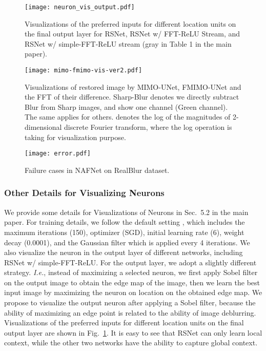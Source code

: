 \documentclass[letterpaper]{article} \usepackage{aaai23}  \usepackage{times}  \usepackage{helvet}  \usepackage{courier}  \usepackage[hyphens]{url}  \usepackage{graphicx} \usepackage{enumitem}
\begin{document}
\begin{figure}[t]
\begin{center}
    \texttt{[image: neuron\_vis\_output.pdf]}
\end{center}
\vspace{-0.8em}
\caption{Visualizations of the preferred inputs for different location units on the final output layer for RSNet, RSNet w/ FFT-ReLU Stream, and RSNet w/ simple-FFT-ReLU stream (\colorbox{gray!20}{gray} in Table 1 in the main paper).} 
\label{fig:neuron_vis_output}
\vspace{-1em}
\end{figure}

\begin{figure*}[t]
\begin{center}
    \texttt{[image: mimo-fmimo-vis-ver2.pdf]}
\end{center}
\caption{Visualizations of restored image by MIMO-UNet, FMIMO-UNet and the FFT of their difference. Sharp-Blur denotes we directly subtract Blur from Sharp images, and show one channel (Green channel). The same
applies for others.  denotes the log of the magnitudes of 2-dimensional discrete Fourier transform, where the log operation is taking for visualization purpose.}
\label{fig:mimo-fmimo-vis}
\end{figure*}

\begin{figure}[t]
\begin{center}
    \texttt{[image: error.pdf]}
\end{center}
\caption{Failure cases in NAFNet on RealBlur dataset.} 
\label{fig:error}
\end{figure}

\subsubsection{Other Details for Visualizing Neurons}
We provide some details for Visualizations of Neurons in Sec.~5.2 in the main paper. For training details, we follow the default setting \cite{uozbulak_pytorch_vis_2021}, which includes the maximum iterations (150), optimizer (SGD), initial learning rate (6), weight decay (0.0001), and the Gaussian filter which is applied every 4 iterations. We also visualize the neuron in the output layer of different networks, including RSNet w/ simple-FFT-ReLU. For the output layer, we adopt a slightly different strategy. \textit{I.e.}, instead of maximizing a selected neuron, we first apply Sobel filter on the output image to obtain the edge map of the image, then we learn the best input image by maximizing the neuron on location  on the obtained edge map. We propose to visualize the output neuron after applying a Sobel filter, because the ability of maximizing an edge point is related to the ability of image deblurring. Visualizations of the preferred inputs for different location units on the final output layer are shown in Fig.~\ref{fig:neuron_vis_output}. It is easy to see that RSNet can only learn local context, while the other two networks have the ability to capture global context.
\end{document}
